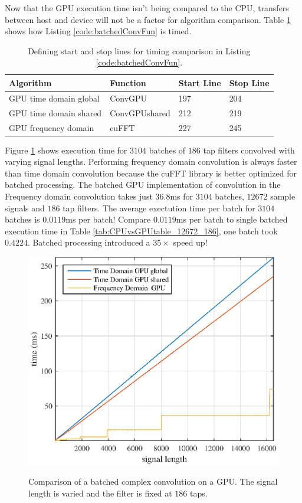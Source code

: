 Now that the GPU execution time isn't being compared to the CPU, transfers between host and device will not be a factor for algorithm comparison.
Table \ref{tab:BatchedGPUtimingTable} shows how Listing \ref{code:batchedConvFun} is timed.
\begin{table}
\caption{Defining start and stop lines for timing comparison in Listing \ref{code:batchedConvFun}.}
\begin{center}
\begin{tabular}{llll}
	\toprule
	Algorithm 				& Function		& Start Line	& Stop  Line		\\ \midrule
	GPU time domain global 	& ConvGPU 		& 197			& 204				\\
	GPU time domain shared 	& ConvGPUshared & 212			& 219				\\
	GPU frequency domain 	& cuFFT			& 227			& 245				\\ 
	\bottomrule
\end{tabular}
\end{center}
\label{tab:BatchedGPUtimingTable}
\end{table}
Figure \ref{fig:CPUvsGPU_3104batch_186taps_varySignal} shows execution time for $3104$ batches of $186$ tap filters convolved with varying signal lengths.
Performing frequency domain convolution is always faster than time domain convolution because the cuFFT library is better optimized for batched processing.
The batched GPU implementation of convolution in the Frequency domain convolution takes just $36.8$ms for $3104$ batches, $12672$ sample signals and $186$ tap filters.
The average exectution time per batch for $3104$ batches is $0.0119$ms per batch!
Compare $0.0119$ms per batch to single batched execution time in Table \ref{tab:CPUvsGPUtable_12672_186}, one batch took $0.4224$.
Batched processing introduced a $35\times$ speed up!
\begin{figure}
	\caption{Comparison of a batched complex convolution on a GPU. The signal length is varied and the filter is fixed at $186$ taps.}
	\centering\includegraphics[width=5in]{figures/gpu_intro/CPUvsGPU_3104batch_186taps_varySignal.eps}
	\label{fig:CPUvsGPU_3104batch_186taps_varySignal}
\end{figure}

